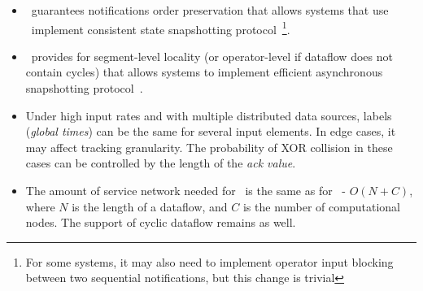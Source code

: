 \begin{itemize}
    \item \tracker\ guarantees notifications order preservation that allows systems that use \tracker\ implement consistent state snapshotting protocol~\footnote{For some systems, it may also need to implement operator input blocking between two sequential notifications, but this change is trivial}.
    \item \tracker\ provides for segment-level locality (or operator-level if dataflow does not contain cycles) that allows systems to implement efficient asynchronous snapshotting protocol~\cite{Carbone:2017:SMA:3137765.3137777}.
    \item Under high input rates and with multiple distributed data sources, labels (\textit{global times}) can be the same for several input elements. In edge cases, it may affect tracking granularity. The probability of XOR collision in these cases can be controlled by the length of the \textit{ack value}.
    \item The amount of service network needed for \tracker\ is the same as for \acker\ - $O(N+C)$, where $N$ is the length of a dataflow, and $C$ is the number of computational nodes. The support of cyclic dataflow remains as well.
\end{itemize}






